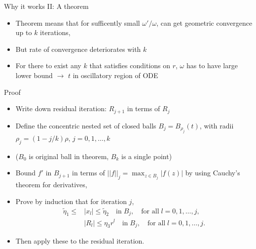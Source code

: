 \documentclass{beamer}
\numberwithin{equation}{theorem}
\begin{document}
\begin{noframe}
    Why it works II: A theorem \\
    \medskip
    {\footnotesize
    \begin{itemize}
    \item{Theorem means that for sufficently small $\omega'/\omega$, can get geometric convergence up to $k$ iterations, }
    \item{But rate of convergence deteriorates with $k$ }
    \item{For there to exist any $k$ that satisfies conditions on $r$, $\omega$ has to have large lower bound $\rightarrow$ $t$ in oscillatory region of ODE}
    \end{itemize}
    }
    Proof \\
    {\footnotesize
    \begin{itemize}
    \item{Write down residual iteration: $R_{j+1}$ in terms of $R_{j}$}
    \item{Define the concentric nested set of closed balls $B_j = B_{\rho_j}(t)$, with radii $\rho_j = (1-j/k)\rho$, $j=0,1,\dots,k$ }
    \item{($B_0$ is original ball in theorem, $B_k$ is a single point)}
    \item{Bound $f'$ in $B_{j+1}$ in terms of $||f||_j = \max_{z \in B_j} |f(z)|$ by using Cauchy's theorem for derivatives, }
    \item{Prove by induction that for iteration $j$, 
    \begin{align}
    \tilde{\eta}_1 \leq &|x_l| \leq \tilde{\eta}_2 \quad \text{in} \; B_j, \quad \text{for all} \; l = 0, 1, \ldots, j, \\ 
    &|R_l| \leq \eta_3 r^{l} \quad \text{in} \; B_j, \quad \text{for all} \; l = 0, 1, \ldots, j.
    \end{align}
    }
    \item{Then apply these to the residual iteration.}
    \end{itemize}
    }

\end{noframe}
\end{document}
